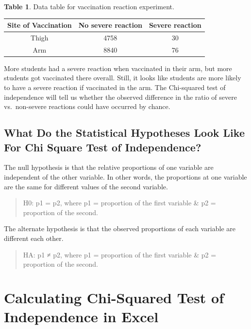 \documentclass[
]{book}
\begin{document}
\textbf{Table 1}. Data table for vaccination reaction experiment.

\begin{longtable}[]{@{}ccc@{}}
\toprule
Site of Vaccination & No severe reaction & Severe reaction \\
\midrule
\endhead
Thigh & 4758 & 30 \\
Arm & 8840 & 76 \\
\bottomrule
\end{longtable}

More students had a severe reaction when vaccinated in their arm, but more students got vaccinated there overall. Still, it looks like students are more likely to have a severe reaction if vaccinated in the arm. The Chi-squared test of independence will tell us whether the observed difference in the ratio of severe vs.~non-severe reactions could have occurred by chance.

\hypertarget{what-do-the-statistical-hypotheses-look-like-for-chi-square-test-of-independence}{%
\subsection{What Do the Statistical Hypotheses Look Like For Chi Square Test of Independence?}\label{what-do-the-statistical-hypotheses-look-like-for-chi-square-test-of-independence}}

The null hypothesis is that the relative proportions of one variable are independent of the other variable. In other words, the proportions at one variable are the same for different values of the second variable.

\begin{quote}
H0: p1 = p2, where p1 = proportion of the first variable \& p2 = proportion of the second.
\end{quote}

The alternate hypothesis is that the observed proportions of each variable are different each other.

\begin{quote}
HA: p1 ≠ p2, where p1 = proportion of the first variable \& p2 = proportion of the second.
\end{quote}

\hypertarget{calculating-chi-squared-test-of-independence-in-excel}{%
\section{Calculating Chi-Squared Test of Independence in Excel}\label{calculating-chi-squared-test-of-independence-in-excel}}
\end{document}
